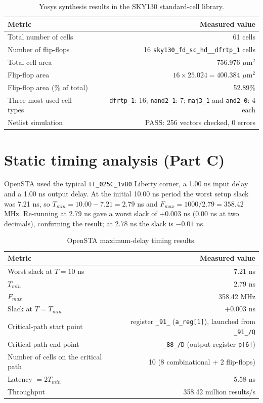 \documentclass[10pt,a4paper]{article}
\newcommand{\code}[1]{\texttt{#1}}
\begin{document}
\begin{table}[h]
\centering\small
\caption{Yosys synthesis results in the SKY130 standard-cell library.}\label{tab:synth}
\begin{tabular}{@{}lr@{}}
\toprule
Metric & Measured value \\
\midrule
Total number of cells & 61 cells \\
Number of flip-flops & 16 \code{sky130\_fd\_sc\_hd\_\_dfrtp\_1} cells \\
Total cell area & 756.976 $\mu$m$^2$ \\
Flip-flop area & $16\times25.024=400.384$ $\mu$m$^2$ \\
Flip-flop area (\% of total) & 52.89\% \\
Three most-used cell types & \code{dfrtp\_1}: 16; \code{nand2\_1}: 7; \code{maj3\_1} and \code{and2\_0}: 4 each \\
Netlist simulation & PASS: 256 vectors checked, 0 errors \\
\bottomrule
\end{tabular}
\end{table}

\section{Static timing analysis (Part C)}
OpenSTA used the typical \code{tt\_025C\_1v80} Liberty corner, a 1.00 ns input delay and a 1.00 ns output delay. At the initial 10.00 ns period the worst setup slack was 7.21 ns, so $T_{min}=10.00-7.21=2.79$ ns and $F_{max}=1000/2.79=358.42$ MHz. Re-running at 2.79 ns gave a worst slack of $+0.003$ ns (0.00 ns at two decimals), confirming the result; at 2.78 ns the slack is $-0.01$ ns.

\begin{table}[h]
\centering\small
\caption{OpenSTA maximum-delay timing results.}\label{tab:sta}
\begin{tabular}{@{}lr@{}}
\toprule
Metric & Measured value \\
\midrule
Worst slack at $T=10$ ns & 7.21 ns \\
$T_{min}$ & 2.79 ns \\
$F_{max}$ & 358.42 MHz \\
Slack at $T=T_{min}$ & $+0.003$ ns \\
Critical-path start point & register \code{\_91\_} (\code{a\_reg[1]}), launched from \code{\_91\_/Q} \\
Critical-path end point & \code{\_88\_/D} (output register \code{p[6]}) \\
Number of cells on the critical path & 10 (8 combinational + 2 flip-flops) \\
Latency $=2T_{min}$ & 5.58 ns \\
Throughput & 358.42 million results/s \\
\bottomrule
\end{tabular}
\end{table}
\end{document}
